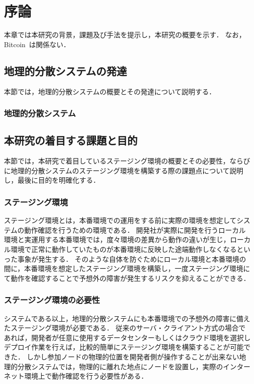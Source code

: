 \chapter{序論}
\label{introduction}

本章では本研究の背景，課題及び手法を提示し，本研究の概要を示す．
なお，Bitcoin~\cite{Bitcoin}は関係ない．

\section{地理的分散システムの発達}
本節では，地理的分散システムの概要とその発達について説明する．

\subsection{地理的分散システム}

\section{本研究の着目する課題と目的}
本節では，本研究で着目しているステージング環境の概要とその必要性，ならびに地理的分散システムのステージング環境を構築する際の課題点について説明し，最後に目的を明確化する．

\subsection{ステージング環境}
ステージング環境とは，本番環境での運用をする前に実際の環境を想定してシステムの動作確認を行うための環境である．
開発社が実際に開発を行うローカル環境と実運用する本番環境では，度々環境の差異から動作の違いが生じ，ローカル環境で正常に動作していたものが本番環境に反映した途端動作しなくなるといった事象が発生する．
そのような自体を防ぐためにローカル環境と本番環境の間に，本番環境を想定したステージング環境を構築し，一度ステージング環境にて動作を確認することで予想外の障害が発生するリスクを抑えることができる．

\subsection{ステージング環境の必要性}
システムである以上，地理的分散システムにも本番環境での予想外の障害に備えたステージング環境が必要である．
従来のサーバ・クライアント方式の場合であれば，開発者が任意に使用するデータセンターもしくはクラウド環境を選択しデプロイ作業を行えば，比較的簡単にステージング環境を構築することが可能できた．
しかし参加ノードの物理的位置を開発者側が操作することが出来ない地理的分散システムでは，物理的に離れた地点にノードを設置し，実際のインターネット環境上で動作確認を行う必要性がある．

